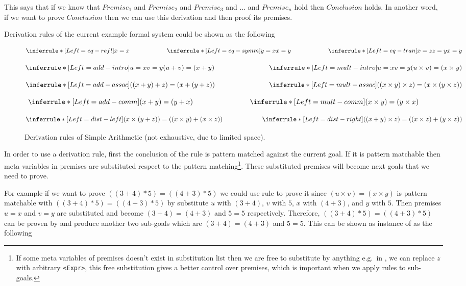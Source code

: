 \documentclass[master.tex]{subfiles}
\begin{document}
This says that if we know that $Premise_1$ and $Premise_2$ and $Premise_3$ and
$\ldots$ and $Premise_n$ hold then $Conclusion$ holds. In another word, if we
want to prove $Conclusion$ then we can use this derivation and then proof its
premises.

Derivation rules of the current example formal system could be shown as the
following

\begin{figure}[H]
\centering
$$
\derivRule{eq-refl}{x = x}{ } \qquad  \qquad  \qquad
\derivRule{eq-symm}{x = y}{y = x} \qquad  \qquad  \qquad
\derivRule{eq-tran}{x = y}{x = z \\ z = y}
$$

$$
\derivRule{add-intro}{(u + v) = (x + y)}{u = x \\ v = y} \qquad  \qquad \qquad \qquad
\derivRule{mult-intro}{(u \times v) = (x \times y)}{u = x \\ v = y}
$$

$$
\derivRule{add-assoc}{((x + y) + z) = (x + (y + z))}{ } \qquad  \qquad  \qquad \qquad
\derivRule{mult-assoc}{((x \times y) \times z) = (x \times (y \times z))}{ }
$$

$$
\derivRule{add-comm}{(x + y) = (y + x)}{ } \qquad  \qquad  \qquad \qquad
\derivRule{mult-comm}{(x \times y) = (y \times x)}{  }
$$

$$
\derivRule{dist-left} {(x \times (y + z)) = ((x \times y) + (x
  \times z))}{ } \qquad \qquad  \qquad
\derivRule{dist-right}{((x + y) \times z) = ((x \times z) + (y
  \times z))}{ }
$$
\caption{Derivation rules of Simple Arithmetic (not exhaustive, due to limited
  space).}
\label{fig:background-derivation-rules}
\end{figure}

In order to use a derivation rule, first the conclusion of the rule is pattern
matched against the current goal. If it is pattern matchable then meta variables
in premises are substituted respect to the pattern matching\footnote{If some
  meta variables of premises doesn't exist in substitution list then we are free
  to substitute by anything e.g.\ in , we can replace $z$ with
  arbitrary \texttt{<Expr>}, this free substitution gives a better control over
  premises, which is important when we apply rules to sub-goals.}. These
substituted premises will become next goals that we need to prove.

For example if we want to prove $((3 + 4) * 5) = ((4 + 3) * 5)$ we could use
rule  to prove it since $(u \times v) = (x \times y)$ is
pattern matchable with $((3 + 4) * 5) = ((4 + 3) * 5)$ by substitute $u$ with $(3 +
4)$, $v$ with $5$, $x$ with $(4 + 3)$, and $y$ with $5$. Then premises $u = x$
and $v = y$ are substituted and become $(3 + 4) = (4 + 3)$ and $5 = 5$
respectively. Therefore, $((3 + 4) * 5) = ((4 + 3) * 5)$ can be proven by
 and produce another two sub-goals which are $(3 + 4) =
(4 + 3)$ and $5 = 5$. This can be shown as instance of 
as the following
\end{document}
